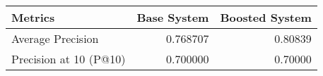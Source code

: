 \begin{tabular}{lrr}
\toprule
               Metrics &  Base System &  Boosted System \\
\midrule
     Average Precision &     0.768707 &         0.80839 \\
Precision at 10 (P@10) &     0.700000 &         0.70000 \\
\bottomrule
\end{tabular}
